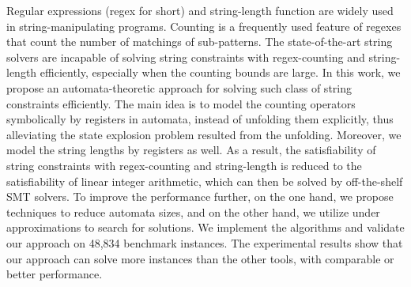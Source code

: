 
%

Regular expressions (regex for short) and string-length function are widely used in string-manipulating programs. 
Counting is a frequently used feature of regexes that count the number of matchings of sub-patterns. The state-of-the-art string solvers are incapable of solving string constraints with regex-counting and string-length efficiently, especially when the counting bounds are large. In this work, we propose an automata-theoretic approach for solving such class of string constraints efficiently. 
%
The main idea is to model the counting operators symbolically by registers in automata, instead of unfolding them explicitly, thus alleviating the state explosion problem resulted from the unfolding.  
%
Moreover, we model the string lengths by registers as well. 
As a result, the satisfiability of string constraints with regex-counting and string-length is reduced to the satisfiability of linear integer arithmetic, which can then be solved by off-the-shelf SMT solvers. 
%
%
To improve the performance further, on the one hand, we propose techniques to reduce automata sizes, 
and on the other hand, we utilize under approximations to search for solutions.   
We implement the algorithms and validate our approach on 48,834 benchmark instances. The experimental results show that 
our approach can solve more instances than the other tools, with comparable or better performance.



%